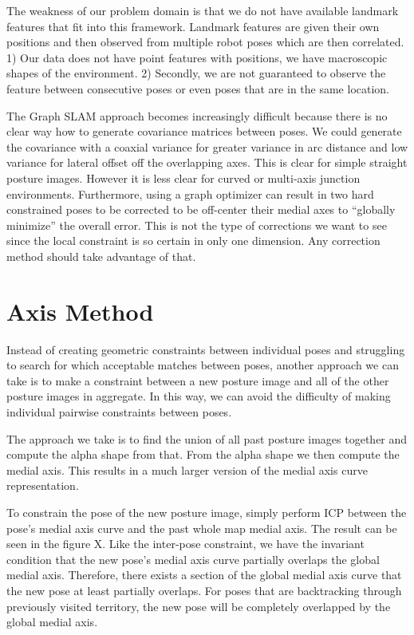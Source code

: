 The weakness of our problem domain is that we do not have available landmark features that fit into this framework. Landmark features are given their own positions and then observed from multiple robot poses which are then correlated. 1) Our data does not have point features with positions, we have macroscopic shapes of the environment. 2) Secondly, we are not guaranteed to observe the feature between consecutive poses or even poses that are in the same location. 

The Graph SLAM approach becomes increasingly difficult because there is no clear way how to generate covariance matrices between poses. We could generate the covariance with a coaxial variance for greater variance in arc distance and low variance for lateral offset off the overlapping axes. This is clear for simple straight posture images. However it is less clear for curved or multi-axis junction environments. Furthermore, using a graph optimizer can result in two hard constrained poses to be corrected to be off-center their medial axes to “globally minimize” the overall error. This is not the type of corrections we want to see since the local constraint is so certain in only one dimension. Any correction method should take advantage of that.

\section{Axis Method}
\label{axismethod}

Instead of creating geometric constraints between individual poses and struggling to search for which acceptable matches between poses, another approach we can take is to make a constraint between a new posture image and all of the other posture images in aggregate. In this way, we can avoid the difficulty of making individual pairwise constraints between poses.

The approach we take is to find the union of all past posture images together and compute the alpha shape from that. From the alpha shape we then compute the medial axis. This results in a much larger version of the medial axis curve representation.

To constrain the pose of the new posture image, simply perform ICP between the pose's medial axis curve and the past whole map medial axis. The result can be seen in the figure X. Like the inter-pose constraint, we have the invariant condition that the new pose's medial axis curve partially overlaps the global medial axis. Therefore, there exists a section of the global medial axis curve that the new pose at least partially overlaps. For poses that are backtracking through previously visited territory, the new pose will be completely overlapped by the global medial axis.

